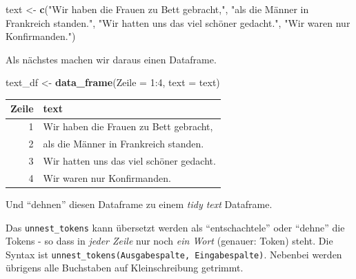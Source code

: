 \documentclass[12pt,]{book}
\newenvironment{Shaded}{\begin{snugshade}}{\end{snugshade}}
\newcommand{\KeywordTok}[1]{\textcolor[rgb]{0.13,0.29,0.53}{\textbf{{#1}}}}
\newcommand{\DataTypeTok}[1]{\textcolor[rgb]{0.13,0.29,0.53}{{#1}}}
\newcommand{\DecValTok}[1]{\textcolor[rgb]{0.00,0.00,0.81}{{#1}}}
\newcommand{\StringTok}[1]{\textcolor[rgb]{0.31,0.60,0.02}{{#1}}}
\newcommand{\CommentTok}[1]{\textcolor[rgb]{0.56,0.35,0.01}{\textit{{#1}}}}
\newcommand{\NormalTok}[1]{{#1}}
\begin{document}
\begin{Shaded}
\begin{Highlighting}[]
\NormalTok{text <-}\StringTok{ }\KeywordTok{c}\NormalTok{(}\StringTok{"Wir haben die Frauen zu Bett gebracht,"}\NormalTok{,}
          \StringTok{"als die Männer in Frankreich standen."}\NormalTok{,}
          \StringTok{"Wir hatten uns das viel schöner gedacht."}\NormalTok{,}
          \StringTok{"Wir waren nur Konfirmanden."}\NormalTok{)}
\end{Highlighting}
\end{Shaded}

Als nächstes machen wir daraus einen Dataframe.

\begin{Shaded}
\begin{Highlighting}[]
\NormalTok{text_df <-}\StringTok{ }\KeywordTok{data_frame}\NormalTok{(}\DataTypeTok{Zeile =} \DecValTok{1}\NormalTok{:}\DecValTok{4}\NormalTok{,}
                      \DataTypeTok{text =} \NormalTok{text)}
\end{Highlighting}
\end{Shaded}

\begin{tabular}{r|l}
\hline
Zeile & text\\
\hline
1 & Wir haben die Frauen zu Bett gebracht,\\
\hline
2 & als die Männer in Frankreich standen.\\
\hline
3 & Wir hatten uns das viel schöner gedacht.\\
\hline
4 & Wir waren nur Konfirmanden.\\
\hline
\end{tabular}

Und ``dehnen'' diesen Dataframe zu einem \emph{tidy text} Dataframe.

\begin{Shaded}
\end{Shaded}

Das \texttt{unnest\_tokens} kann übersetzt werden als ``entschachtele''
oder ``dehne'' die Tokens - so dass in \emph{jeder Zeile} nur noch
\emph{ein Wort} (genauer: Token) steht. Die Syntax ist
\texttt{unnest\_tokens(Ausgabespalte,\ Eingabespalte)}. Nebenbei werden
übrigens alle Buchstaben auf Kleinschreibung getrimmt.
\end{document}
